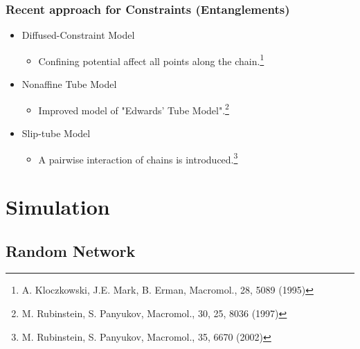 \documentclass[12pt, dvipdfmx]{beamer}
\begin{document}
\setcounter{footnote}{0}
\begin{frame}
	\frametitle{Recent approach for Constraints (Entanglements)}
	\vspace{-2mm}
		\begin{itemize}
			\item Diffused-Constraint Model
			\begin{itemize}
				\item Confining potential affect all points along the chain.\footnote{\tiny{A. Kloczkowski, J.E. Mark, B. Erman, Macromol., 28, 5089 (1995)}}
			\end{itemize}
			\item Nonaffine Tube Model
			\begin{itemize}
				\item Improved model of "Edwards' Tube Model".\footnote{\tiny{M. Rubinstein, S. Panyukov, Macromol., 30, 25, 8036 (1997)}}
			\end{itemize}
			\item \alert<2>{Slip-tube Model}
			\begin{itemize}
				\item A pairwise interaction of chains is introduced.\footnote{\tiny{M. Rubinstein, S. Panyukov, Macromol., 35, 6670 (2002)}}
			\end{itemize}
		\end{itemize}

		\vspace{1mm}
		\centering
\end{frame}

\section{Simulation}
\subsection{Random Network}
\end{document}
